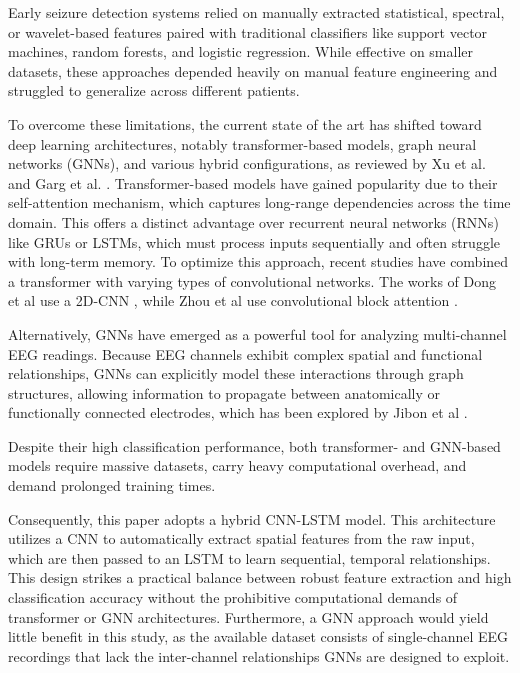 

Early seizure detection systems relied on manually extracted statistical, spectral, or wavelet-based features paired with traditional classifiers like support vector machines, random forests, and logistic regression. While effective on smaller datasets, these approaches depended heavily on manual feature engineering and struggled to generalize across different patients.

To overcome these limitations, the current state of the art has shifted toward deep learning architectures, notably transformer-based models, graph neural networks (GNNs), and various hybrid configurations, as reviewed by Xu et al. \cite{XU2024128644} and Garg et al. \cite{review}. Transformer-based models have gained popularity due to their self-attention mechanism, which captures long-range dependencies across the time domain. This offers a distinct advantage over recurrent neural networks (RNNs) like GRUs or LSTMs, which must process inputs sequentially and often struggle with long-term memory. To optimize this approach, recent studies have combined a transformer with varying types of convolutional networks. The works of Dong et al use a 2D-CNN \cite{DONG2025107075}, while Zhou et al use convolutional block attention \cite{Zhou2026}.

Alternatively, GNNs have emerged as a powerful tool for analyzing multi-channel EEG readings. Because EEG channels exhibit complex spatial and functional relationships, GNNs can explicitly model these interactions through graph structures, allowing information to propagate between anatomically or functionally connected electrodes, which has been explored by Jibon et al \cite{jibon2024sequential}.

Despite their high classification performance, both transformer- and GNN-based models require massive datasets, carry heavy computational overhead, and demand prolonged training times.

Consequently, this paper adopts a hybrid CNN-LSTM model. This architecture utilizes a CNN to automatically extract spatial features from the raw input, which are then passed to an LSTM to learn sequential, temporal relationships. This design strikes a practical balance between robust feature extraction and high classification accuracy without the prohibitive computational demands of transformer or GNN architectures. Furthermore, a GNN approach would yield little benefit in this study, as the available dataset consists of single-channel EEG recordings that lack the inter-channel relationships GNNs are designed to exploit.